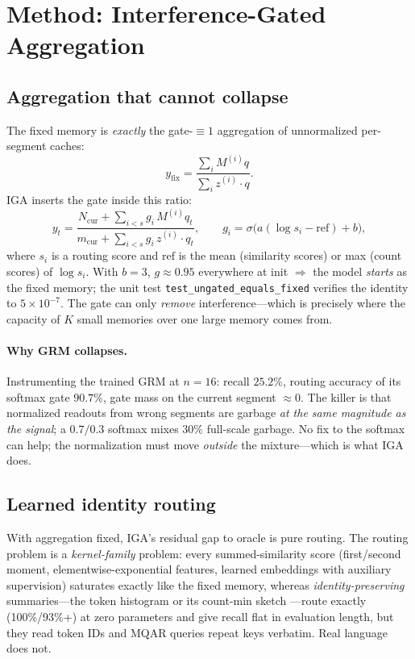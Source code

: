 \documentclass[11pt]{article}
\begin{document}
\section{Method: Interference-Gated Aggregation}

\subsection{Aggregation that cannot collapse}

The fixed memory is \emph{exactly} the gate-$\equiv 1$ aggregation of
unnormalized per-segment caches:
\[
y_{\mathrm{fix}} = \frac{\sum_i M^{(i)}q}{\sum_i z^{(i)}\!\cdot\!q}.
\]
IGA inserts the gate inside this ratio:
\[
y_t = \frac{N_{\mathrm{cur}} + \sum_{i<s} g_i\,M^{(i)}q_t}
            {m_{\mathrm{cur}} + \sum_{i<s} g_i\,z^{(i)}\!\cdot\!q_t},
\qquad
g_i = \sigma\!\big(a(\log s_i - \mathrm{ref}) + b\big),
\]
where $s_i$ is a routing score and $\mathrm{ref}$ is the mean (similarity scores)
or max (count scores) of $\log s_i$. With $b=3$, $g\approx 0.95$ everywhere at
init $\Rightarrow$ the model \emph{starts} as the fixed memory; the unit test
\texttt{test\_ungated\_equals\_fixed} verifies the identity to $5\times10^{-7}$.
The gate can only \emph{remove} interference---which is precisely where the
capacity of $K$ small memories over one large memory comes from.

\paragraph{Why GRM collapses.} Instrumenting the trained GRM at $n=16$: recall
$25.2\%$, routing accuracy of its softmax gate $90.7\%$, gate mass on the current
segment $\approx 0$. The killer is that normalized readouts from wrong segments
are garbage \emph{at the same magnitude as the signal}; a $0.7/0.3$ softmax mixes
$30\%$ full-scale garbage. No fix to the softmax can help; the normalization must
move \emph{outside} the mixture---which is what IGA does.

\subsection{Learned identity routing}

With aggregation fixed, IGA's residual gap to oracle is pure routing. The routing
problem is a \emph{kernel-family} problem: every summed-similarity score
(first/second moment, elementwise-exponential features, learned embeddings with
auxiliary supervision) saturates exactly like the fixed memory, whereas
\emph{identity-preserving} summaries---the token histogram or its count-min
sketch \citep{cormode2005countmin}---route exactly (100\%/93\%+) at zero
parameters and give recall flat in evaluation length, but they read token IDs and
MQAR queries repeat keys verbatim. Real language does not.
\end{document}
